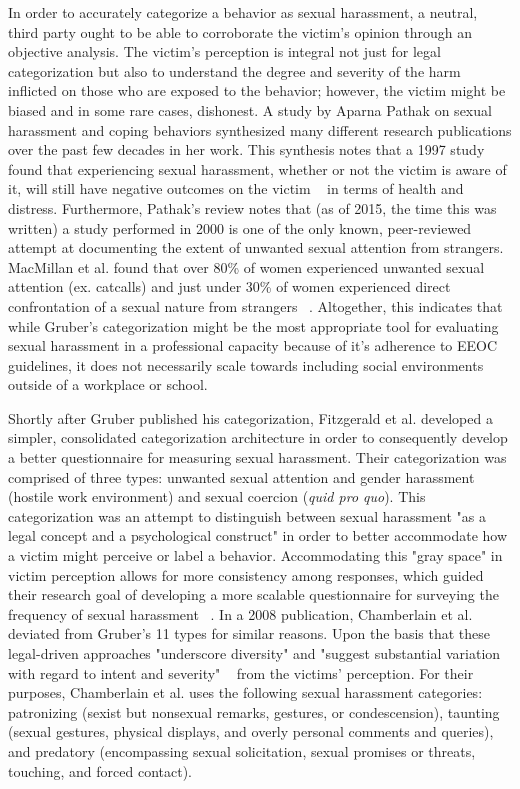 In order to accurately categorize a behavior as sexual harassment, a neutral, third party ought to be able to corroborate the victim's opinion through an objective analysis. The victim's perception is integral not just for legal categorization but also to understand the degree and severity of the harm inflicted on those who are exposed to the behavior; however, the victim might be biased and in some rare cases, dishonest. A study by Aparna Pathak on sexual harassment and coping behaviors synthesized many different research publications over the past few decades in her work. This synthesis notes that a 1997 study found that experiencing sexual harassment, whether or not the victim is aware of it, will still have negative outcomes on the victim ~\cite{schneider1997effects} in terms of health and distress. Furthermore, Pathak's review notes that (as of 2015, the time this was written) a study performed in 2000 is one of the only known, peer-reviewed attempt at documenting the extent of unwanted sexual attention from strangers. MacMillan et al. found that over 80\% of women experienced unwanted sexual attention (ex. catcalls) and just under 30\% of women experienced direct confrontation of a sexual nature from strangers ~\cite{macmillan2000street}. Altogether, this indicates that while Gruber's categorization might be the most appropriate tool for evaluating sexual harassment in a professional capacity because of it's adherence to EEOC guidelines, it does not necessarily scale towards including social environments outside of a workplace or school.

Shortly after Gruber published his categorization, Fitzgerald et al. developed a simpler, consolidated categorization architecture in order to consequently develop a better questionnaire for measuring sexual harassment. Their categorization was comprised of three types: unwanted sexual attention and gender harassment (hostile work environment) and sexual coercion (\textit{quid pro quo}). This categorization was an attempt to distinguish between sexual harassment "as a legal concept and a psychological construct" in order to better accommodate how a victim might perceive or label a behavior. Accommodating this "gray space" in victim perception allows for more consistency among responses, which guided their research goal of developing a more scalable questionnaire for surveying the frequency of sexual harassment ~\cite{fitzgerald1995measuring}. In a 2008 publication, Chamberlain et al. deviated from Gruber's 11 types for similar reasons. Upon the basis that these legal-driven approaches "underscore diversity" and "suggest substantial variation with regard to intent and severity" ~\cite{chamberlain2008newcategories} from the victims' perception. For their purposes, Chamberlain et al. uses the following sexual harassment categories: patronizing (sexist but nonsexual remarks, gestures, or condescension), taunting (sexual gestures, physical displays, and overly personal comments and queries), and predatory (encompassing sexual solicitation, sexual promises or threats, touching, and forced contact).

